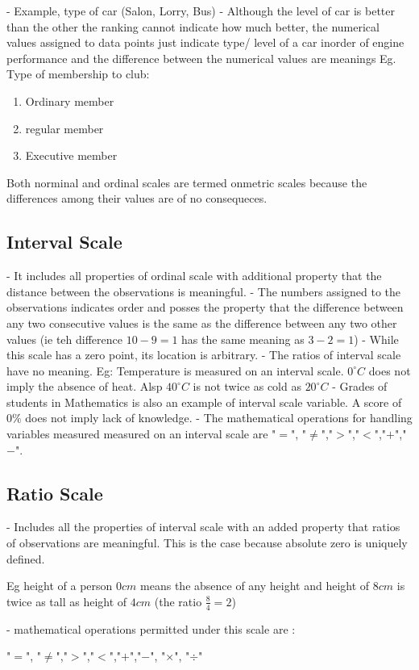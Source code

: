 \documentclass[12pt,a4paper]{article}
\begin{document}
- Example, type of car (Salon, Lorry, Bus)
- Although the level of car is better than the other the ranking cannot indicate how much better, the numerical values assigned to data points just indicate type/ level of a car inorder of engine performance and the difference between the numerical values are meanings Eg. Type of membership to club:
\begin{enumerate}
    \item Ordinary member
    \item regular member
    \item Executive member
\end{enumerate}
Both norminal and ordinal scales are termed onmetric scales because the differences among their values are of no consequeces.
\subsection{Interval Scale}
- It includes all properties of ordinal scale with additional property that the distance between the observations is meaningful.
- The numbers assigned to the observations indicates order and posses the property that the difference between any two consecutive values is the same as the difference between any two other values (ie teh difference $10 - 9 = 1$ has the same meaning as $3 - 2 = 1$)
- While this scale has a zero point, its location is arbitrary.
- The ratios of interval scale have no meaning.
Eg: Temperature is measured on an interval scale. $0^{\circ}C$ does not imply the absence of heat. Alsp $40^{\circ}C$ is not twice as cold as $20^{\circ}C$
- Grades of students in Mathematics is also an example of interval scale variable. A score of $0\%$ does not imply lack of knowledge.
- The mathematical operations for handling variables measured measured on an interval scale are "$=$", "$\neq$","$>$","$<$","$+$","$-$".
\subsection{Ratio Scale}
- Includes all the properties of interval scale with an added property that ratios of observations are meaningful. This is the case because absolute zero is uniquely defined.

Eg height of a person $0cm$ means the absence of any height and height of $8cm$ is twice as tall as height of $4cm$ (the ratio $\frac{8}{4} = 2$)

- mathematical operations permitted under this scale are :

"$=$", "$\neq$","$>$","$<$","$+$","$-$", "$\times$", "$\div$"
\end{document}
